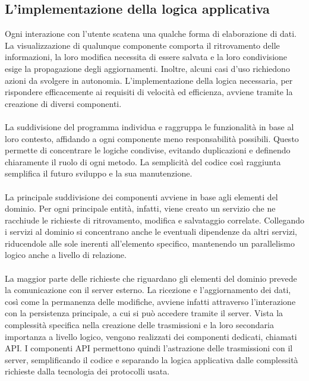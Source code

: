 \clearpage


\subsection{L'implementazione della logica applicativa}

Ogni interazione con l'utente scatena una qualche forma di elaborazione di dati.
La visualizzazione di qualunque componente comporta il ritrovamento delle informazioni,
la loro modifica necessita di essere salvata e la loro condivisione esige la propagazione degli aggiornamenti.
Inoltre, alcuni casi d'uso richiedono azioni da svolgere in autonomia.
L'implementazione della logica necessaria,
per rispondere efficacemente ai requisiti di velocità ed efficienza,
avviene tramite la creazione di diversi componenti.\\
\\
La suddivisione del programma individua e raggruppa le funzionalità in base al loro contesto,
affidando a ogni componente meno responsabilità possibili.
Questo permette di concentrare le logiche condivise,
evitando duplicazioni e definendo chiaramente il ruolo di ogni metodo.
La semplicità del codice così raggiunta semplifica il futuro sviluppo e la sua manutenzione.\\
\\
La principale suddivisione dei componenti avviene in base agli elementi del dominio.
Per ogni principale entità, infatti, viene creato un servizio che ne racchiude
le richieste di ritrovamento, modifica e salvataggio correlate.
Collegando i servizi al dominio si concentrano anche le eventuali dipendenze da altri servizi,
riducendole alle sole inerenti all'elemento specifico,
mantenendo un parallelismo logico anche a livello di relazione.\\
\\
La maggior parte delle richieste che riguardano gli elementi del dominio prevede
la comunicazione con il server esterno.
La ricezione e l'aggiornamento dei dati, così come la permanenza delle modifiche, avviene infatti attraverso
l'interazione con la persistenza principale, a cui si può accedere tramite il server.
Vista la complessità specifica nella creazione delle trasmissioni e
la loro secondaria importanza a livello logico,
vengono realizzati dei componenti dedicati, chiamati API.
I componenti API permettono quindi l'astrazione delle trasmissioni con il server,
semplificando il codice e
separando la logica applicativa dalle complessità richieste dalla tecnologia dei protocolli usata.

